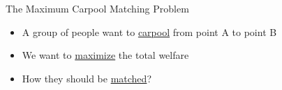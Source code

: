 \begin{frame}{The Maximum Carpool Matching Problem}
\begin{itemize}
	\item<1> A group of people want to \underline{carpool} from point A to point B
	\item<2> We want to \underline{maximize} the total welfare
	\item<3> How they should be \underline{matched}?
\end{itemize}

\centering


\end{frame}